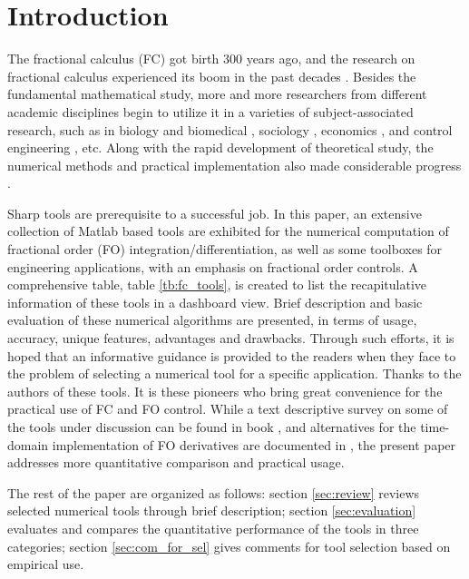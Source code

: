 \documentclass[11pt]{tCON2e}
\theoremstyle{plain}\newtheorem{theorem}{Theorem}
\theoremstyle{definition}
\theoremstyle{remark}
\begin{document}
\section{Introduction}


The fractional calculus (FC) got birth 300 years ago, and the research on fractional calculus experienced its boom in the past decades \cite{ref:Mainardi_recent_FC, ref:Miller_Ross_intro_frac_book, ref:Agrawal_Machado_book_FC_advance}.
Besides the fundamental mathematical study, more and more researchers from different academic disciplines begin to utilize it in a varieties of subject-associated research, such as in biology and biomedical \cite{ref:Magin, ref:Bruce_Book_where}, sociology \cite{ref:Bruce_Book_social, ref:Book_of_Extremes}, economics \cite{ref:long_memo_new_model, ref:random_walk_wall_st_book}, and control engineering \cite{ref:Monje, ref:Yinchun_Automatica, ref:Zhuo_relay_id_fo}, etc.
Along with the rapid development of theoretical study, the numerical methods and practical implementation also made considerable progress \cite{ref:Machado_implementation, ref:Bohannan2, ref:Hartley6}.

Sharp tools are prerequisite to a successful job. In this paper, an extensive collection of Matlab based tools are exhibited for the numerical computation of fractional order (FO) integration/differentiation, as well as some toolboxes for engineering applications, with an emphasis on fractional order controls. A comprehensive table, table \ref{tb:fc_tools}, is created to list the recapitulative information of these tools in a dashboard view. Brief description and basic evaluation of these numerical algorithms are presented, in terms of usage, accuracy, unique features, advantages and drawbacks. Through such efforts, it is hoped that an informative guidance is provided to the readers when they face to the problem of selecting a numerical tool for a specific application.
Thanks to the authors of these tools. It is these pioneers who bring great convenience for the practical use of FC and FO control. While a text descriptive survey on some of the tools under discussion can be found in book \cite{ref:FO_sig_proc_2012}, and  alternatives for the time-domain implementation of FO derivatives are documented in \cite{ref:Valerio_time_implem}, the present paper addresses more quantitative comparison and practical usage.

The rest of the paper are organized as follows: section \ref{sec:review} reviews  selected numerical tools through brief description; section \ref{sec:evaluation} evaluates and compares the quantitative performance of the tools in three categories; section \ref{sec:com_for_sel} gives comments for tool selection based on empirical use.
\end{document}
